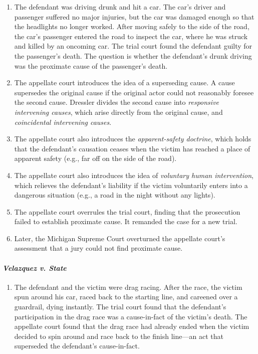 \begin{enumerate}
    \item The defendant was driving drunk and hit a car. The car's driver and passenger suffered no major injuries, but the car was damaged enough so that the headlights no longer worked. After moving safely to the side of the road, the car's passenger entered the road to inspect the car, where he was struck and killed by an oncoming car. The trial court found the defendant guilty for the passenger's death. The question is whether the defendant's drunk driving was the proximate cause of the passenger's death.
    \item The appellate court introduces the idea of a superseding cause. A cause supersedes the original cause if the original actor could not reasonably foresee the second cause. Dressler divides the second cause into \emph{responsive intervening causes}, which arise directly from the original cause, and \emph{coincidental intervening causes}.
    \item The appellate court also introduces the \emph{apparent-safety doctrine}, which holds that the defendant's causation ceases when the victim has reached a place of apparent safety (e.g., far off on the side of the road).
    \item The appellate court also introduces the idea of \emph{voluntary human intervention}, which relieves the defendant's liability if the victim voluntarily enters into a dangerous situation (e.g., a road in the night without any lights).
    \item The appellate court overrules the trial court, finding that the prosecution failed to establish proximate cause. It remanded the case for a new trial.
    \item Later, the Michigan Supreme Court overturned the appellate court's assessment that a jury could not find proximate cause.
\end{enumerate}

\paragraph{\emph{Velazquez v. State}}

\begin{enumerate}
    \item The defendant and the victim were drag racing. After the race, the victim spun around his car, raced back to the starting line, and careened over a guardrail, dying instantly. The trial court found that the defendant's participation in the drag race was a cause-in-fact of the victim's death. The appellate court found that the drag race had already ended when the victim decided to spin around and race back to the finish line---an act that superseded the defendant's cause-in-fact.
\end{enumerate}
